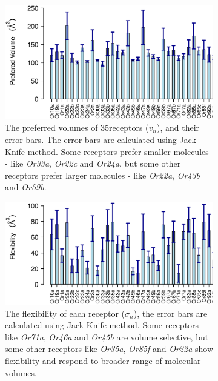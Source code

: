 \documentclass[11pt]{paper} %
\newcommand{\numberofreceptors}{35}
\begin{document}
\begin{figure}
	\begin{subfigure}[b]{\textwidth}
		\includegraphics[width=\textwidth]{fig/mean-vol}
		\caption{The preferred volumes of \numberofreceptors receptors ($v_n$), and their error bars. 
		The error bars are calculated using Jack-Knife method. 
		Some receptors prefer smaller molecules - like {\it Or33a}, {\it Or22c} and {\it Or24a}, 
		but some other receptors prefer larger molecules - like {\it Or22a}, {\it Or43b} and {\it Or59b}.}
		\label{fig:preferred_volume}
	\end{subfigure}
	\begin{subfigure}[b]{\textwidth}
		\includegraphics[width=\textwidth]{fig/std-vol}
		\caption{The flexibility of each receptor ($\sigma_n$), the error bars are calculated using Jack-Knife method.
			Some receptors like {\it Or71a}, {\it Or46a} and {\it Or45b} are volume  selective, 
			but some other receptors like {\it Or35a},  {\it Or85f} and {\it Or22a} show flexibility and respond to broader range of molecular volumes.
		}
		\label{fig:volume_flexibility}
	\end{subfigure}
	\caption{}
\end{figure}
\end{document}
